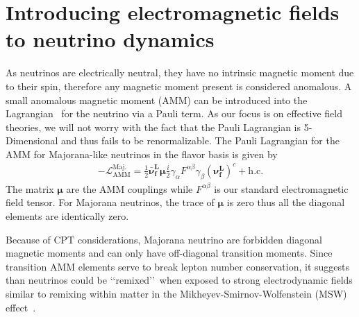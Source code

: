 \documentclass[a4paper]{article}
\newcommand*{\bb}{\boldsymbol}
\begin{document}
\section{Introducing electromagnetic fields to neutrino dynamics}
\label{sec:numoment}
\noindent As neutrinos are electrically neutral, they have no intrinsic magnetic moment due to their spin, therefore any magnetic moment present is considered anomalous. A small anomalous magnetic moment (AMM) can be introduced into the Lagrangian~\citep{Itzykson:1980rh,Steinmetz:2018ryf} for the neutrino via a Pauli term. As our focus is on effective field theories, we will not worry with the fact that the Pauli Lagrangian is 5-Dimensional and thus fails to be renormalizable. The Pauli Lagrangian for the AMM for Majorana-like neutrinos in the flavor basis is given by
\begin{align}
	\label{moment:1} -\mathcal{L}_{\mathrm{AMM}}^\mathrm{Maj.}=\frac{1}{2}\bb{\bar{\nu}_{f}^{L}}\bb{\mu}\frac{i}{2}\gamma_{\alpha}F^{\alpha\beta}\gamma_{\beta}\left(\bb{\nu_{f}^{L}}\right)^{c}+\mathrm{h.c.}
\end{align}
The matrix $\bb{\mu}$ are the AMM couplings while $F^{\alpha\beta}$ is our standard electromagnetic field tensor. For Majorana neutrinos, the trace of $\bb{\mu}$ is zero thus all the diagonal elements are identically zero.

Because of CPT considerations, Majorana neutrino are forbidden diagonal magnetic moments and can only have off-diagonal transition moments. Since transition AMM elements serve to break lepton number conservation, it suggests than neutrinos could be \lq\lq remixed\rq\rq\ when exposed to strong electrodynamic fields similar to remixing within matter in the Mikheyev-Smirnov-Wolfenstein (MSW) effect~\citep{wolfenstein1978neutrino,mikheev1985resonance,bethe1986possible,greiner2009gauge}. 
\end{document}
